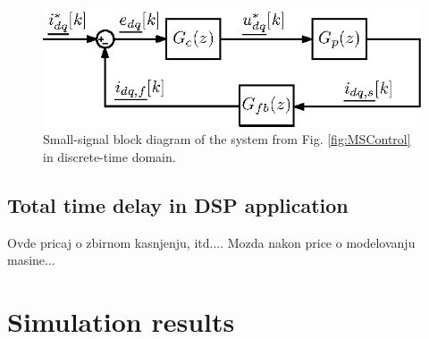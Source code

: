 \documentclass[journal]{IEEEtran}
\begin{document}
\begin{figure}[t!]
    \centerline{\includegraphics[width=0.95\linewidth]{figures/small_signal.eps}}
    \caption{Small-signal block diagram of the system from Fig. \ref{fig:MSControl} in discrete-time domain.}
    \label{fig:SmallSignal}
\end{figure}



\subsection{Total time delay in DSP application}
Ovde pricaj o zbirnom kasnjenju, itd....
Mozda nakon price o modelovanju masine...



\section{Simulation results}
\end{document}
